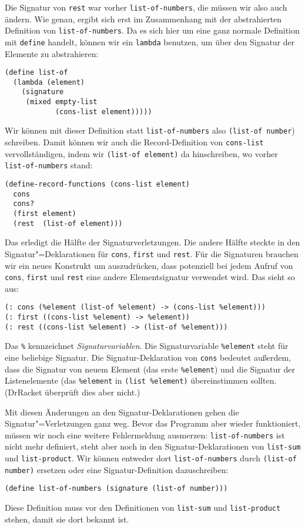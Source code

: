 Die Signatur von \lstinline{rest} war vorher
\lstinline{list-of-numbers}, die müssen wir also auch ändern.  Wie
genau, ergibt sich erst im Zusammenhang mit der abstrahierten
Definition von \lstinline{list-of-numbers}.  Da es sich hier um eine
ganz normale Definition mit \lstinline{define} handelt, können wir ein
\lstinline{lambda} benutzen, um über den Signatur der Elemente zu
abstrahieren:
%
\begin{lstlisting}
(define list-of
  (lambda (element)
    (signature
     (mixed empty-list
            (cons-list element)))))
\end{lstlisting}
%
Wir können mit dieser Definition statt \lstinline{list-of-numbers} also
\lstinline{(list-of number}) schreiben.  Damit können wir auch die
Record-Definition von \lstinline{cons-list} vervollständigen, indem
wir \lstinline{(list-of element)} da hinschreiben, wo vorher
\lstinline{list-of-numbers} stand:
%
\begin{lstlisting}
(define-record-functions (cons-list element)
  cons
  cons?
  (first element)
  (rest  (list-of element)))
\end{lstlisting}
%
Das erledigt die Hälfte der Signaturverletzungen.  Die andere Hälfte
steckte in den Signatur"=Deklarationen für \lstinline{cons},
\lstinline{first} und \lstinline{rest}.  Für die Signaturen brauchen
wir ein neues Konstrukt um auszudrücken, dass potenziell bei jedem
Aufruf von \lstinline{cons}, \lstinline{first} und \lstinline{rest}
eine andere Elementsignatur verwendet wird.  Das sieht so aus:
%
\begin{lstlisting}
(: cons (%element (list-of %element) -> (cons-list %element)))
(: first ((cons-list %element) -> %element))
(: rest ((cons-list %element) -> (list-of %element)))
\end{lstlisting}
%
Das \verb|%| kennzeichnet
\textit{Signaturvariablen}.  Die
Signaturvariable \lstinline{%element} steht für eine beliebige
Signatur.  Die Signatur-Deklaration von \lstinline{cons} bedeutet
außerdem, dass die Signatur von neuem Element (das erste \lstinline{%element})
und die Signatur der Listenelemente (das \lstinline{%element} in 
\lstinline{(list %element)} übereinstimmen sollten.  (DrRacket
  überprüft dies aber nicht.)

Mit diesen Änderungen an den Signatur-Deklarationen gehen die
Signatur"=Verletzungen ganz weg.  Bevor das Programm aber wieder
funktioniert, müssen wir noch eine weitere Fehlermeldung
ausmerzen: \lstinline{list-of-numbers} ist nicht mehr
definiert, steht aber noch in den Signatur-Deklarationen von
\lstinline{list-sum} und \lstinline{list-product}.  Wir können
entweder dort \lstinline{list-of-numbers} durch \lstinline{(list-of number)}
ersetzen oder eine Signatur-Definition
dazuschreiben:
%
\begin{lstlisting}
(define list-of-numbers (signature (list-of number)))
\end{lstlisting}
%
Diese Definition muss vor den Definitionen von \lstinline{list-sum}
und \lstinline{list-product} stehen, damit sie dort bekannt ist.

